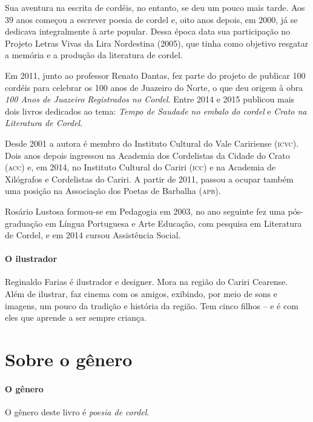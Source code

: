 \documentclass[11pt]{extarticle}
\begin{document}
Sua aventura na escrita de cordéis, no entanto, se deu um pouco mais tarde. Aos 39 anos começou a escrever poesia de cordel e, oito anos depois, em 2000, já se dedicava integralmente à arte popular. Dessa época data sua participação no Projeto Letras Vivas da Lira Nordestina (2005), que tinha como objetivo resgatar a memória e a produção da literatura de cordel.

Em 2011, junto ao professor Renato Dantas, fez parte do projeto de publicar 100 cordéis para celebrar os 100 anos de Juazeiro do Norte, o que deu origem à obra \textit{100 Anos de Juazeiro Registrados no Cordel}. Entre 2014 e 2015 publicou mais dois livros dedicados ao tema: \textit{Tempo de Saudade no embalo do cordel} e \textit{Crato na Literatura de Cordel}.

Desde 2001 a autora é membro do Instituto Cultural do Vale Caririense (\textsc{icvc}). Dois anos depois ingressou na Academia dos Cordelistas da Cidade do Crato (\textsc{acc}) e, em 2014, no Instituto Cultural do Cariri (\textsc{icc}) e na Academia de Xilógrafos e Cordelistas do Cariri. A partir de 2011, passou a ocupar também uma posição na Associação dos Poetas de Barbalha (\textsc{apb}).

Rosário Lustosa formou-se em Pedagogia em 2003, no ano seguinte fez uma pós-graduação em Língua Portuguesa e Arte Educação, com pesquisa em Literatura de Cordel, e em 2014 cursou Assistência Social.

\paragraph{O ilustrador}

Reginaldo Farias é ilustrador e designer. Mora na região do Cariri Cearense. Além de ilustrar, faz cinema com os amigos, exibindo, por meio de sons e imagens, um pouco da tradição e história da região. Tem cinco filhos -- e é com eles que aprende a ser sempre criança. 


\section{Sobre o gênero}

\paragraph{O gênero} O gênero deste livro é \textit{poesia de cordel}. 
\end{document}
